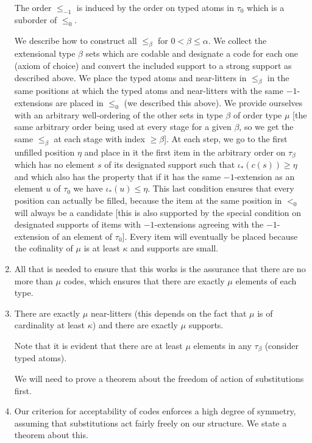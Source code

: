 \documentclass[12pt]{article}
\begin{document}
\begin{enumerate}
The order $\leq_{-1}$
is induced by the order on typed atoms in $\tau_0$ which is a suborder of $\leq_0$.



We describe how to construct all $\leq_\beta$ for $0<\beta \leq \alpha$.  We collect the extensional type $\beta$ sets which are codable and designate a code for each one (axiom of choice) and convert the included support to a strong support as described above. We place the typed atoms and near-litters  in $\leq_\beta$ in the same positions at which the typed atoms and near-litters with the same $-1$-extensions are placed in
$\leq_0$ (we described this above).  We provide ourselves with an arbitrary well-ordering of the other sets in type $\beta$ of order type $\mu$ [the same arbitrary order being used at every stage for a given $\beta$, so we get the same $\leq_\beta$ at each stage with index $\geq\beta$].  At each step, we go to the first unfilled position $\eta$ and place in it the first item in the arbitrary order on $\tau_\beta$ which has no element $s$ of its designated support such that $\iota_*(c(s))\geq \eta$ and which also has the property that
if it has the same $-1$-extension as an element $u$ of $\tau_0$ we have $\iota_*(u) \leq \eta$.  This last condition ensures that every position can actually be filled, because the item at the same position in $<_0$ will always be a candidate [this is also supported by the special condition on designated supports of items with $-1$-extensions agreeing with the $-1$-extension of an element of $\tau_0$].  Every item will eventually be placed because the cofinality of $\mu$ is at least $\kappa$ and supports are small.

\item All that is needed to ensure that this works is the assurance that there are no more than $\mu$ codes, which ensures that there are exactly $\mu$ elements of each type.

\item  There are exactly $\mu$ near-litters (this depends on the fact that $\mu$ is of cardinality at least $\kappa$) and there are exactly $\mu$ supports.

Note that it is evident that there are at least $\mu$ elements in any $\tau_\beta$ (consider typed atoms).

We will need to prove a theorem about the freedom of action of substitutions first.

\item Our criterion for acceptability of codes enforces a high degree of symmetry, assuming that substitutions act fairly freely on our structure.  We state a theorem about this.


\end{enumerate}
\end{document}
